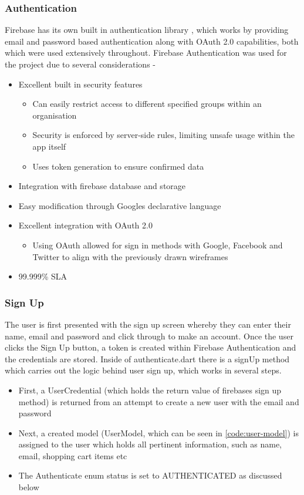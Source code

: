 \documentclass[12pt]{article}
\begin{document}
	\subsubsection{Authentication}
	\label{authentication}
	Firebase has its own built in authentication library \cite{FirebaseAuthentication2021}, which works by providing email and password based authentication along with OAuth 2.0 capabilities, both which were used extensively throughout. Firebase Authentication was used for the project due to several considerations -
	\begin{itemize}
		\item Excellent built in security features
		\begin{itemize}
			\item Can easily restrict access to different specified groups within an organisation
			\item Security is enforced by server-side rules, limiting unsafe usage within the app itself
			\item Uses token generation to ensure confirmed data
		\end{itemize}
		\item Integration with firebase database and storage
		\item Easy modification through Googles declarative language
		\item Excellent integration with OAuth 2.0
		\begin{itemize}
			\item Using OAuth allowed for sign in methods with Google, Facebook and Twitter to align with the previously drawn wireframes
		\end{itemize}
		\item 99.999\% SLA
	\end{itemize}
	
	
	\subsubsection{Sign Up}
	The user is first presented with the sign up screen whereby they can enter their name, email and password and click through to make an account. Once the user clicks the Sign Up button, a token is created within Firebase Authentication and the credentials are stored. Inside of authenticate.dart there is a signUp method which carries out the logic behind user sign up, which works in several steps.
	\begin{itemize}
		\item First, a UserCredential (which holds the return value of firebases sign up method) is returned from an attempt to create a new user with the email and password
		\item Next, a created model (UserModel, which can be seen in \autoref{code:user-model}) is assigned to the user which holds all pertinent information, such as name, email, shopping cart items etc
		\item The Authenticate enum status is set to AUTHENTICATED as discussed below
	\end{itemize}
	
\end{document}
